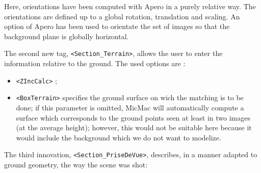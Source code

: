 Here, orientations have been computed with Apero in a purely relative way. The orientations
are defined up to a global rotation, translation and scaling. An option of Apero has been
used to orientate the set of images so that the background plane is globally horizontal.

The second new tag, {\tt <Section\_Terrain>}, allows the user to enter the
information relative to the ground. The used options are :

\begin{itemize}
   \item  {\tt <ZIncCalc>} ;

   \item  {\tt <BoxTerrain>}  specifies the ground surface on wich the matching is to be done;
          if  this  parameter is omitted, MicMac will automatically compute a surface which corresponds
          to the ground points seen at least in
          two images (at the average height); however, this would not be suitable
          here because it would include the background which we do not want to modelize.

\end{itemize}


The third innovation, {\tt <Section\_PriseDeVue>}, describes, in a manner adapted to ground geometry,
the way the scene was shot:


